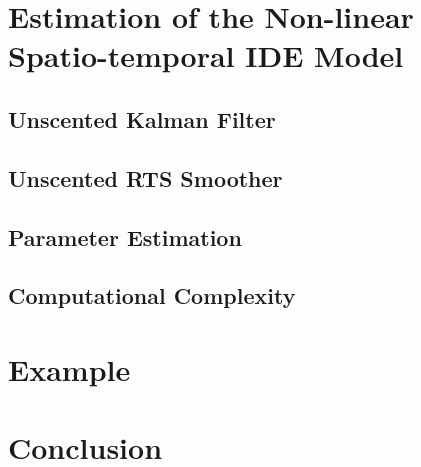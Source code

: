\documentclass[a4paper,10pt]{article}
\begin{document}
\section{Estimation of the Non-linear Spatio-temporal IDE Model}

\subsection{Unscented Kalman Filter}
\subsection{Unscented RTS Smoother}
\subsection{Parameter Estimation}
\subsection{Computational Complexity}
\section{Example}
\section{Conclusion}



\appendices
\end{document}
